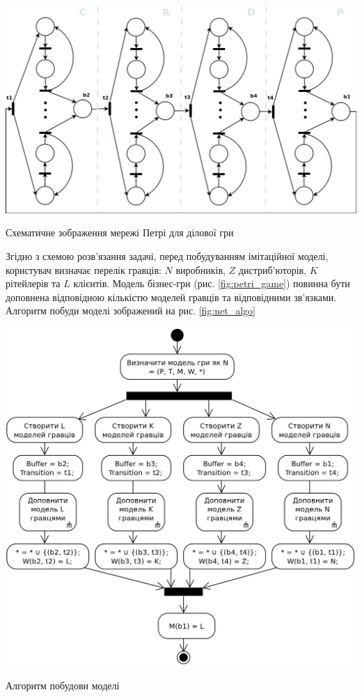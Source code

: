 \begin{stdfigure}  
    \includegraphics[width=7in]{images/big_petri_net.png}
    \caption{Схематичне зображення мережі Петрі для ділової гри}
    \label{fig:petri_game}
\end{stdfigure}
Згідно з схемою розв’язання задачі, перед побудуванням імітаційної моделі, користувач визначає перелік гравців: $N$ виробників, $Z$ дистриб’юторів, $K$ рітейлерів та $L$ клієнтів. Модель бізнес-гри (рис. \ref{fig:petri_game}) повинна бути доповнена відповідною кількістю моделей гравців та відповідними зв’язками. Алгоритм побуди моделі зображений на рис. \ref{fig:net_algo}
\begin{stdfigure}  
    \includegraphics[width=5.5in]{images/algo.png}
    \caption{Алгоритм побудови моделі}
    \label{fig:net_algo}
\end{stdfigure}
